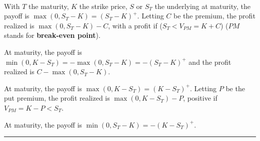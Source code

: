 \begin{f}

\ %


With \(T\) the maturity, \(K\) the strike price, \(S\) or \(S_T\) the underlying at maturity, the payoff is \(\max (0, S_T-K)=( S_T-K)^{+}\).
Letting \(C\) be the premium, the profit realized is \(\max (0, S_T-K)-C\), with a profit if (\(S_T<V_{PM}=K + C\)) (\(PM\) stands for \textbf{break-even point}).

		


\medskip



At maturity, the payoff is \(\min (0,K- S_T)=-\max(0, S_T-K)=-( S_T-K)^{+}\) and the profit realized is \(C-\max (0, S_T-K)\).

\medskip

		
\medskip



At maturity, the payoff is \(\max (0,K- S_T)=(K- S_T)^{+}\).
Letting \(P\) be the put premium, the profit realized is \(\max (0,K- S_T)-P\), positive if \(V_{PM}=K -P<S_T\).

\medskip

	    	     


\medskip

	    	     

At maturity, the payoff is \(\min (0, S_T-K)=-(K- S_T)^+\).


\end{f}
\hrule

